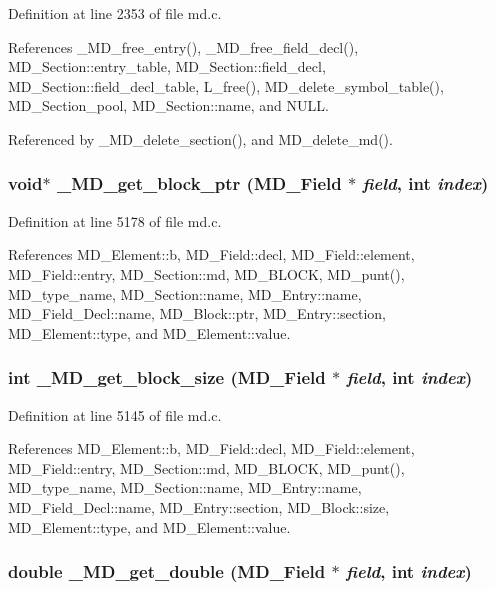 Definition at line 2353 of file md.c.

References \_\-MD\_\-free\_\-entry(), \_\-MD\_\-free\_\-field\_\-decl(), MD\_\-Section::entry\_\-table, MD\_\-Section::field\_\-decl, MD\_\-Section::field\_\-decl\_\-table, L\_\-free(), MD\_\-delete\_\-symbol\_\-table(), MD\_\-Section\_\-pool, MD\_\-Section::name, and NULL.

Referenced by \_\-MD\_\-delete\_\-section(), and MD\_\-delete\_\-md().
\subsubsection{\setlength{\rightskip}{0pt plus 5cm}void$\ast$ \_\-MD\_\-get\_\-block\_\-ptr (\bf{MD\_\-Field} $\ast$ {\em field}, int {\em index})}\label{md_8c_898294195d5f245139109c36c97ca8fb}




Definition at line 5178 of file md.c.

References MD\_\-Element::b, MD\_\-Field::decl, MD\_\-Field::element, MD\_\-Field::entry, MD\_\-Section::md, MD\_\-BLOCK, MD\_\-punt(), MD\_\-type\_\-name, MD\_\-Section::name, MD\_\-Entry::name, MD\_\-Field\_\-Decl::name, MD\_\-Block::ptr, MD\_\-Entry::section, MD\_\-Element::type, and MD\_\-Element::value.
\subsubsection{\setlength{\rightskip}{0pt plus 5cm}int \_\-MD\_\-get\_\-block\_\-size (\bf{MD\_\-Field} $\ast$ {\em field}, int {\em index})}\label{md_8c_297b39db0c2c0711d95d59a929f8b7e0}




Definition at line 5145 of file md.c.

References MD\_\-Element::b, MD\_\-Field::decl, MD\_\-Field::element, MD\_\-Field::entry, MD\_\-Section::md, MD\_\-BLOCK, MD\_\-punt(), MD\_\-type\_\-name, MD\_\-Section::name, MD\_\-Entry::name, MD\_\-Field\_\-Decl::name, MD\_\-Entry::section, MD\_\-Block::size, MD\_\-Element::type, and MD\_\-Element::value.
\subsubsection{\setlength{\rightskip}{0pt plus 5cm}double \_\-MD\_\-get\_\-double (\bf{MD\_\-Field} $\ast$ {\em field}, int {\em index})}\label{md_8c_8e92a04e4f935b09887e5d2a19edbdfc}




